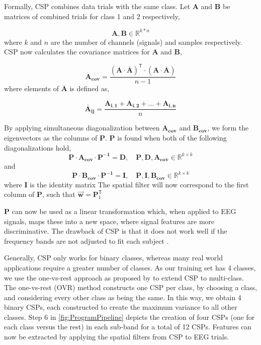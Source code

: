 Formally, CSP combines data trials with the same class. Let $\pmb{A}$ and $\pmb{B}$ be matrices of combined trials for class 1 and 2 respectively,

\begin{equation}
\label{eq:csp_data}
\pmb{A}, \mathbf{B} \in \mathbb{R}^{k*n}
\end{equation}
where $k$ and $n$ are the number of channels (signals) and samples respectively. CSP now calculates the covariance matrices for $\pmb{A}$ and $\pmb{B}$,

\begin{equation}
\label{eq:covariance_matrice}
\pmb{A_{cov}} = \frac{(\pmb{A} \cdot \overline{\pmb{A}})^\mathsf{T}  \cdot (\pmb{A} \cdot \overline{\pmb{A}})}{n - 1}
\end{equation}
where elements of $\overline{\pmb{A}}$ is defined as,

\begin{equation}
\label{eq:a_bar}
\pmb{\overline{A}_{ij}} = \frac{\pmb{A_{i,1}} + \pmb{A_{i,2}} + ... + \pmb{A_{i,n}}}{n}
\end{equation}

By applying simultaneous diagonalization between $\pmb{A_{cov}}$ and $\pmb{B_{cov}}$, we form the eigenvectors as the columns of $\pmb{P}$. $\pmb{P}$ is found when both of the following diagonalizations hold, 
\begin{equation}
\label{eq:diagonalization_A}
\pmb{P} \cdot \pmb{A_{cov}} \cdot \pmb{P^{-1}} = \pmb{D}, \quad \pmb{P}, \pmb{D}, \pmb{A_{cov}} \in \mathbb{R}^{k \times k}
\end{equation}
and
\begin{equation}
\label{eq:diagonalization_B}
\pmb{P} \cdot \pmb{B_{cov}} \cdot \pmb{P^{-1}} = \pmb{I}, \quad \pmb{P}, \pmb{I}, \pmb{B_{cov}} \in \mathbb{R}^{k \times k}
\end{equation}
where $\pmb{I}$ is the identity matrix
The spatial filter will now correspond to the first column of $\pmb{P}$, such that $\pmb{\vec{w}} = \pmb{P}^\mathsf{T}_{1}$ 

$\pmb{P}$ can now be used as a linear transformation which, when applied to EEG signals, maps these into a new space, where signal features are more discriminative. The drawback of CSP is that it does not work well if the frequency bands are not adjusted to fit each subject \citep{novi2007sub}.

Generally, CSP only works for binary classes, whereas many real world applications require a greater number of classes. As our training set has 4 classes, we use the one-vs-rest approach as proposed by \cite{ang2012filter} to extend CSP to multi-class. The one-vs-rest (OVR) method constructs one CSP per class, by choosing a class, and considering every other class as being the same. In this way, we obtain 4 binary CSPs, each constructed to create the maximum variance to all other classes. Step 6 in \cref{fig:ProgramPipeline} depicts the creation of four CSPs (one for each class versus the rest) in each sub-band for a total of 12 CSPs. Features can now be extracted by applying the spatial filters from CSP to EEG trials.

